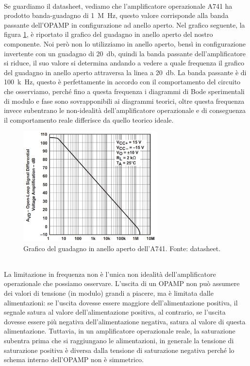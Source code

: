 \documentclass{report}
\begin{document}
\\Se guardiamo il datasheet, vediamo che l'amplificatore operazionale \textmu A741 ha prodotto banda-guadagno di \SI{1}{M\hertz}, questo valore corrisponde alla banda passante dell'OPAMP in configurazione ad anello aperto. Nel grafico seguente, la figura \ref{figura:bandaguad}, è riportato il grafico del guadagno in anello aperto del nostro componente. Noi però non lo utilizziamo in anello aperto, bensì in configurazione invertente con un guadagno di \SI{20}{\decibel}, quindi la banda passante dell'amplificatore si riduce, il suo valore si determina andando a vedere a quale frequenza il grafico del guadagno in anello aperto attraversa la linea a \SI{20}{\decibel}. La banda passante è di \SI{100}{k\hertz}, questo è perfettamente in accordo con il comportamento del circuito che osserviamo, perché fino a questa frequenza i diagrammi di Bode sperimentali di modulo e fase sono sovrapponibili ai diagrammi teorici, oltre questa frequenza invece subentrano le non-idealità dell'amplificatore operazionale e di conseguenza il comportamento reale differisce da quello teorico ideale.
\begin{figure}[h!]
	\centering
	\includegraphics[height=6cm]{immagini/gbw}
	\caption{Grafico del guadagno in anello aperto dell'\textmu A741. Fonte: datasheet.} %
	\label{figura:bandaguad}
\end{figure}
\\La limitazione in frequenza non è l'unica non idealità dell'amplificatore operazionale che possiamo osservare. L'uscita di un OPAMP non può assumere dei valori di tensione (in modulo) grandi a piacere, ma è limitata dalle alimentazioni: se l'uscita dovesse essere maggiore dell'alimentazione positiva, il segnale satura al valore dell'alimentazione positiva, al contrario, se l'uscita dovesse essere più negativa dell'alimentazione negativa, satura al valore di questa alimentazione. Tuttavia, in un amplificatore operazionale reale, la saturazione subentra prima che si raggiungano le alimentazioni, in generale la tensione di saturazione positiva è diversa dalla tensione di saturazione negativa perché lo schema interno dell'OPAMP non è simmetrico. \par %
\end{document}
